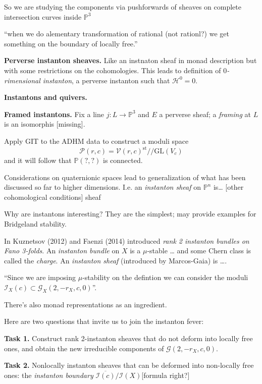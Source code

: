 So we are studying the components via
pushforwards of sheaves on complete
intersection curves inside $\mathbb{P}^3$

``when we do alementary transformation of
rational (not rationl?) we get
something on the boundary of locally free.''

\medskip\noindent
{\bf Perverse instanton sheaves.} Like an
instnaton sheaf in monad description but with
some restrictions on the cohomologies. This
leads to definition of {\it $0$-rimensional
instanton}, a perverse instanton such that
$\mathcal{H}^0=0$.

\medskip\noindent
{\bf Instantons and quivers.}

\medskip\noindent
{\bf Framed instantons.} Fix a line $j:L\to
\mathbb{P}^3$ and $E$ a perverse
sheaf; a {\it framing} at $L$ is an
isomorphis [missing].

Apply GIT to the ADHM data to construct a
moduli space
$$
\mathcal{P}(r,c)=\mathcal{V}(r,c)^{\text{st}}
/\!/\text{GL}(V_c)
$$
and it will follow that $\mathbb{P}(?,?)$ is
connected.

\medskip\noindent

Considerations on quaternionic spaces lead to
generalization of what has been discussed so
far to higher dimensions. I.e. an {\it
instanton sheaf} on $\mathbb{P}^n$ is… [other
cohomological conditions] sheaf

Why are instantons interesting? They are the
simplest; may provide examples for Bridgeland
stability.

In Kuznetsov (2012) and Faenzi (2014)
introduced {\it rank 2 instanton bundles on
Fano 3-folds}. An {\it instanton bundle} on
$X$ is a $\mu$-stable … and some Chern class
is called the {\it charge}. An {\it instanton
sheaf} (introduced by Marcos-Gaia) is ….

 ``Since we are imposing $\mu$-stability on
the defintion we can consider the moduli
$\mathcal{I}_X(c) \subset
\mathcal{G}_X(2,-r_X,c,0)$''.

There's also monad representations as an
ingredient.

\medskip\noindent
Here are two questions that invite us to join
the instanton fever:

\medskip\noindent
{\bf Task 1.} Construct rank 2-instanton
sheaves that do not deform into locally free
ones, and obtain the new irreducible
components of $\mathcal{G}(2,-r_X,c,0)$.

\medskip\noindent
{\bf Task 2.} Nonlocally instanton sheaves
that can be deformed into non-locally free
ones: the {\it instanton boundary}
$\overline{\mathcal{I}(c)}/\mathcal{I}(X)
$[formula
right?]


